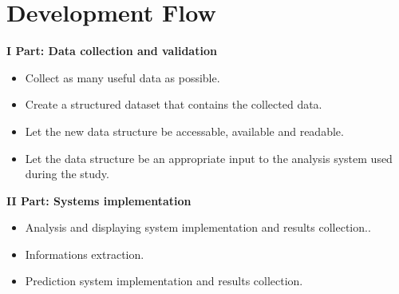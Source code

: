 




\section{Development Flow}
\vspace{-5mm}
\textbf{I Part: Data collection and validation}
\vspace{-5mm}
\begin{itemize}
 \setlength{\itemsep}{-5pt}
 \item Collect as many useful data as possible.
 \item Create a structured dataset that contains the collected data.
 \item Let the new data structure be accessable, available and readable.
 \item Let the data structure be an appropriate input to the analysis system used during the study.
\end{itemize}


\textbf{II Part: Systems implementation}
\vspace{-5mm}
\begin{itemize}
 \setlength{\itemsep}{-5pt}
 \item Analysis and displaying system implementation and results collection..
 \item Informations extraction.
 \item Prediction system implementation and results collection.
\end{itemize}


